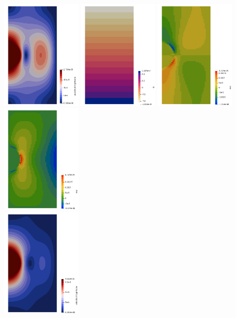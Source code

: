 \begin{center}
\includegraphics[width=4cm]{python_codes/fieldstone_91/results/ps/vel}
\includegraphics[width=4cm]{python_codes/fieldstone_91/results/ps/press}
\includegraphics[width=4cm]{python_codes/fieldstone_91/results/ps/exx}
\includegraphics[width=4cm]{python_codes/fieldstone_91/results/ps/exy}\\
\includegraphics[width=4cm]{python_codes/fieldstone_91/results/axi/vel}

\end{center}
